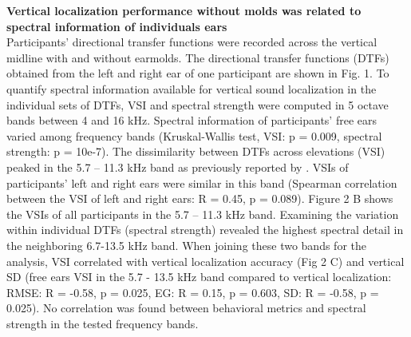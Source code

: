 \noindent \textbf{Vertical localization performance without molds was related to spectral information of individuals ears}\\
Participants' directional transfer functions were recorded across the vertical midline with and without earmolds. The directional transfer functions (DTFs) obtained from the left and right ear of one participant are shown in Fig. 1. To quantify spectral information available for vertical sound localization in the individual sets of DTFs, VSI \citep{trapeau_fast_2016} and spectral strength \citep{middlebrooks_individual_1999} were computed in 5 octave bands between 4 and 16 kHz. Spectral information of participants’ free ears varied among frequency bands (Kruskal-Wallis test, VSI: p = 0.009, spectral strength: p = 10e-7). The dissimilarity between DTFs across elevations (VSI) peaked in the 5.7 – 11.3 kHz band as previously reported by \citet{trapeau_fast_2016}. VSIs of participants' left and right ears were similar in this band (Spearman correlation between the VSI of left and right ears: R = 0.45, p = 0.089). Figure 2 B shows the VSIs of all participants in the 5.7 – 11.3 kHz band. Examining the variation within individual DTFs (spectral strength) revealed the highest spectral detail in the neighboring 6.7-13.5 kHz band. When joining these two bands for the analysis, VSI correlated with vertical localization accuracy (Fig 2 C) and vertical SD (free ears VSI in the 5.7 - 13.5 kHz band compared to vertical localization: RMSE: R = -0.58, p = 0.025, EG: R = 0.15, p = 0.603, SD: R = -0.58, p = 0.025). No correlation was found between behavioral metrics and spectral strength in the tested frequency bands.

